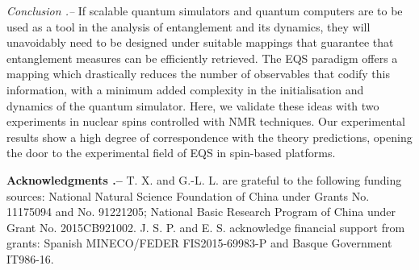 \documentclass[10pt,nofootinbib,notitlepage,twocolumn,superscriptaddress]{revtex4-1}
\theoremstyle{plain}
\theoremstyle{definition}
\begin{document}
{\it{Conclusion .--}} If scalable quantum simulators and quantum computers are to be used as a tool in the analysis of entanglement and its dynamics, they will unavoidably need to be designed under suitable mappings that guarantee that entanglement measures can be efficiently retrieved. The EQS paradigm offers a mapping which drastically reduces the number of observables that codify this information, with a minimum added complexity in the initialisation and dynamics of the quantum simulator. Here, we validate these ideas with two experiments in nuclear spins controlled with NMR techniques. Our experimental results show a high degree of correspondence with the theory predictions, opening the door to the experimental field of EQS in spin-based platforms.


{\bf Acknowledgments .--} T. X. and G.-L. L. are grateful to the following funding sources: National Natural Science Foundation of China under Grants No. 11175094 and No. 91221205; National Basic Research Program of China under Grant No. 2015CB921002. J. S. P. and E. S. acknowledge financial support from grants: Spanish MINECO/FEDER FIS2015-69983-P and Basque Government IT986-16.
\end{document}
